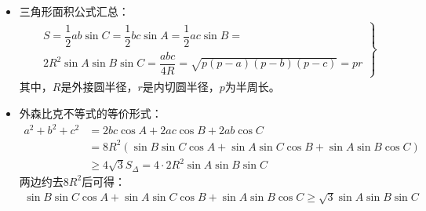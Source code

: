 \begin{itemize}[leftmargin=\inteval{\myitemleftmargin}pt,itemsep=
   \inteval{\myitemitempsep}pt,topsep=\inteval{\myitemtopsep}pt]
记$ u=a^4+b^4+c^4,\ v=a^2b^2+b^2c^2+c^2a^2 ,\ w=a^2+b^2+c^2 $，
那么$ w^2=u+2v $，根据柯西不等式：$ u\geq v $，那么$ w^2=u+2v \geq 3(-u+2v)=
48 \cdot \dfrac{-u+2v}{16}=48 S_{\Delta ABC}^2 $，开平方后有：
$ w\geq 4\sqrt{3}S_{\Delta ABC} $，即
\begin{gather}\label{外森比克不等式}
    a^2+b^2+c^2 \geq 4\sqrt{3}S_{\Delta ABC}
\end{gather}
此不等式被称为外森比克(Weitzenböck)不等式。
等号成立的条件是$ a=b=c $，即$ \Delta ABC $
是等边三角形。再利用余弦定理来逆向分析外森比克不等式，
$ a^2+b^2+c^2=a^2+b^2+(a^2+b^2-2ab\cos C)\geq 4\sqrt{3}\cdot
\dfrac{1}{2}ab\sin C $，移项，
$ 2(a^2+b^2)\geq 2ab(\cos C+\sqrt{3}\sin C)=4ab\sin(C+\dfrac{\pi}{6}) $，
此不等式显然成立。 所以，当$ a^2+b^2+c^2=4\sqrt{3}S_{\Delta ABC}=
\left\{\begin{aligned}
    & 2\sqrt{3}ab\sin C \\
    & 2\sqrt{3}bc\sin A \\
    & 2\sqrt{3}ac\sin B
\end{aligned}\right. $时，$ \Delta ABC $一定是等边三角形。

\item 三角形面积公式汇总：
\begin{gather}\label{三角形面积公式汇总}
    \left.    
    \begin{gathered}
        S=\dfrac{1}{2}ab\sin C=\dfrac{1}{2}bc\sin A=\dfrac{1}{2}ac\sin B=\\ 
        2R^2\sin A\sin B\sin C=\dfrac{abc}{4R}=\sqrt{p(p-a)(p-b)(p-c)}=pr
    \end{gathered} \right\}
\end{gather}
其中，$ R $是外接圆半径，$ r $是内切圆半径，$ p $为半周长。

\item 外森比克不等式的等价形式：
\begin{align*}
    a^2+b^2+c^2 &=2bc\cos A+2ac\cos B+2ab\cos C \\
    &=8R^2(\sin B\sin C\cos A+\sin A\sin C\cos B+\sin A\sin B\cos C) \\
    &\geq 4\sqrt{3}S_{\Delta}=4\cdot 2R^2\sin A\sin B\sin C
\end{align*}
两边约去$ 8R^2 $后可得：
\begin{gather*}
    \sin B\sin C\cos A+\sin A\sin C\cos B+\sin A\sin B\cos C
    \geq \sqrt{3} \sin A\sin B\sin C
\end{gather*}


\end{itemize}
